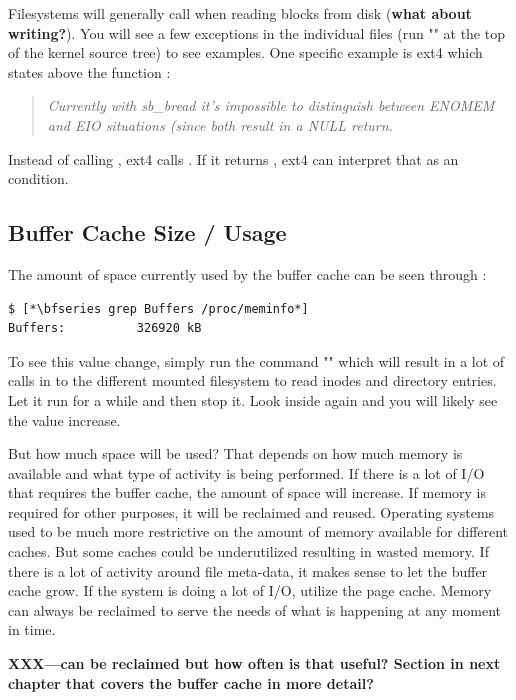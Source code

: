 Filesystems will generally call  when reading blocks from disk (\textbf{what about writing?}). You will see a few exceptions in the individual files (run "" at the top of the kernel source tree) to see examples. One specific example is ext4 which states above the function :

\begin{quote}
\textit{Currently with sb\_bread it's impossible to distinguish between ENOMEM and EIO situations (since both result in a NULL return.}
\end{quote}

\noindent
Instead of calling , ext4 calls . If it returns , ext4 can interpret that as an  condition.

\subsection{Buffer Cache Size / Usage}

The amount of space currently used by the buffer cache can be seen through :

\begin{lstlisting}
$ [*\bfseries grep Buffers /proc/meminfo*]
Buffers:          326920 kB
\end{lstlisting}

\noindent
To see this value change, simply run the command "" which will result in a lot of calls in to the different mounted filesystem to read inodes and directory entries. Let it run for a while and then stop it. Look inside  again and you will likely see the value increase.

But how much space will be used? That depends on how much memory is available and what type of activity is being performed. If there is a lot of I/O that requires the buffer cache, the amount of space will increase. If memory is required for other purposes, it will be reclaimed and reused. Operating systems used to be much more restrictive on the amount of memory available for different caches. But some caches could be underutilized resulting in wasted memory. If there is a lot of activity around file meta-data, it makes sense to let the buffer cache grow. If the system is doing a lot of I/O, utilize the page cache. Memory can always be reclaimed to serve the needs of what is happening at any moment in time.

\textbf{XXX---can be reclaimed but how often is that useful? Section in next chapter that covers the buffer cache in more detail?}

